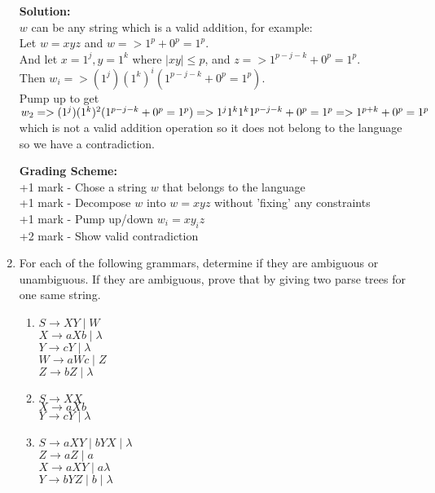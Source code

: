\documentclass[11pt, article, oneside]{memoir}
\begin{document}
\begin{enumerate}
        \textbf{Solution:}
        \\\(w\) can be any string which is a valid addition, for example:
        \\Let \(w = xyz\) and \(w => {1^p+0^p=1^p}\).
        \\And let \(x = 1^j, y = 1^k\) where \(|xy| \leq p\), and \(z => {1^{p - j - k}+0^p=1^p}\).
        \\Then \(w_i => {(1^j)(1^k)^i(1^{p - j - k}+0^p=1^p)}\).
        \\Pump up to get \(w_2 => {(1^j)(1^k)^2(1^{p - j - k}+0^p=1^p)}
        \\=> {1^j1^k1^k1^{p - j - k}+0^p=1^p}
        \\=> {1^{p+k}+0^p=1^p}\)
        \\which is not a valid addition operation so it does not belong to the language so we have a contradiction.

        \textbf{Grading Scheme:}
        \\+1 mark - Chose a string \(w\) that belongs to the language
        \\+1 mark - Decompose \(w\) into \(w = xyz\) without 'fixing' any constraints
        \\+1 mark - Pump up/down \(w_i = xy_iz\)
        \\+2 mark - Show valid contradiction
        
    \item
        For each of the following grammars, determine if they are ambiguous or unambiguous. If they are ambiguous, prove that by giving two parse trees for one same string.
        \begin{enumerate}
            \item
                \(S \rightarrow XY \mid W \)
                \\\(X \rightarrow aXb \mid \lambda\)
                \\\(Y \rightarrow cY \mid \lambda\)
                \\\(W \rightarrow aWc \mid Z\)
                \\\(Z \rightarrow bZ \mid \lambda\)
            \item
                \(S \rightarrow XX \)
                \\\(X \rightarrow aXb\)
                \\\(Y \rightarrow cY \mid \lambda\)
            \item
                \(S \rightarrow aXY \mid bYX \mid \lambda \)
                \\\(Z \rightarrow aZ \mid a\)
                \\\(X \rightarrow aXY \mid a \lambda\)
                \\\(Y \rightarrow bYZ \mid b \mid \lambda\) 
        \end{enumerate}


\end{enumerate}
\end{document}
